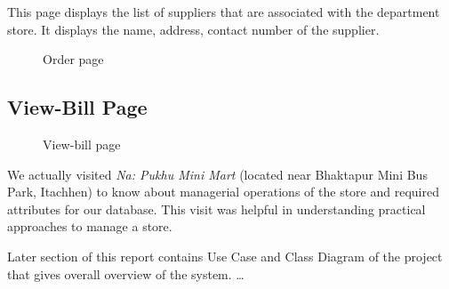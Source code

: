This page displays the list of suppliers that are associated with the
department store. It displays the name, address, contact number of the
supplier.

\begin{figure}[h!]\centering
  \caption{Order page}\label{fig:order}
\end{figure}

\subsection{View-Bill Page}

\begin{figure}[h!]\centering
  \caption{View-bill page}\label{fig:bill-info}
\end{figure}

We actually visited {\em Na: Pukhu Mini Mart} (located near Bhaktapur Mini Bus
Park, Itachhen) to know about managerial operations of the store and required
attributes for our database. This visit was helpful in understanding practical
approaches to manage a store.

Later section of this report contains Use Case and Class Diagram of the project
that gives overall overview of the system. \ldots
